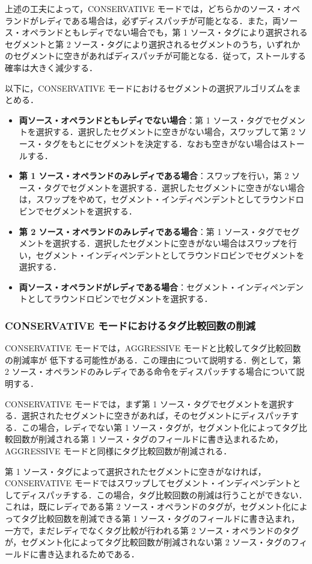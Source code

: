 \documentclass[submit,techrep,noauthor]{ipsj}
\begin{document}
上述の工夫によって，CONSERVATIVE モードでは，どちらかのソース・オペランドがレディである場合は，必ずディスパッチが可能となる．また，両ソース・オペランドともレディでない場合でも，第 1 ソース・タグにより選択されるセグメントと第 2 ソース・タグにより選択されるセグメントのうち，いずれかのセグメントに空きがあればディスパッチが可能となる．従って，ストールする確率は大きく減少する．

以下に，CONSERVATIVE モードにおけるセグメントの選択アルゴリズムをまとめる．
\begin{itemize}
  \item \textbf{両ソース・オペランドともレディでない場合}：第 1 ソース・タグでセグメントを選択する．選択したセグメントに空きがない場合，スワップして第 2 ソース・タグをもとにセグメントを決定する．なおも空きがない場合はストールする．
  \item \textbf{第 1 ソース・オペランドのみレディである場合}：スワップを行い，第 2 ソース・タグでセグメントを選択する．選択したセグメントに空きがない場合は，スワップをやめて，セグメント・インディペンデントとしてラウンドロビンでセグメントを選択する．
  \item \textbf{第 2 ソース・オペランドのみレディである場合}：第 1 ソース・タグでセグメントを選択する．選択したセグメントに空きがない場合はスワップを行い，セグメント・インディペンデントとしてラウンドロビンでセグメントを選択する．
  \item \textbf{両ソース・オペランドがレディである場合}：セグメント・インディペンデントとしてラウンドロビンでセグメントを選択する．
\end{itemize}

\subsubsection{CONSERVATIVE モードにおけるタグ比較回数の削減}
CONSERVATIVE モードでは，AGGRESSIVE モードと比較してタグ比較回数の削減率が 低下する可能性がある．この理由について説明する．例として，第 2 ソース・オペランドのみレディである命令をディスパッチする場合について説明する．

CONSERVATIVE モードでは，まず第 1 ソース・タグでセグメントを選択する．選択されたセグメントに空きがあれば，そのセグメントにディスパッチする．この場合，レディでない第 1 ソース・タグが，セグメント化によってタグ比較回数が削減される第 1 ソース・タグのフィールドに書き込まれるため，AGGRESSIVE モードと同様にタグ比較回数が削減される．

第 1 ソース・タグによって選択されたセグメントに空きがなければ，CONSERVATIVE モードではスワップしてセグメント・インディペンデントとしてディスパッチする．この場合，タグ比較回数の削減は行うことができない．これは，既にレディである第 2 ソース・オペランドのタグが，セグメント化によってタグ比較回数を削減できる第 1 ソース・タグのフィールドに書き込まれ，一方で，まだレディでなくタグ比較が行われる第 2 ソース・オペランドのタグが，セグメント化によってタグ比較回数が削減されない第 2 ソース・タグのフィールドに書き込まれるためである．
\end{document}
